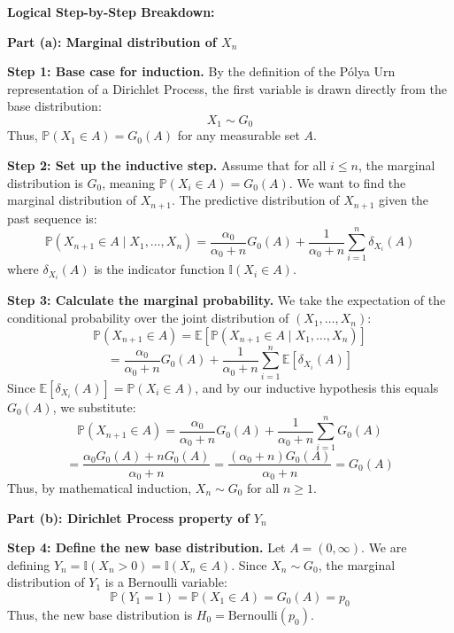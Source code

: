 \begin{solution}
\textbf{Logical Step-by-Step Breakdown:}

\textbf{Part (a): Marginal distribution of $X_n$}

\textbf{Step 1: Base case for induction.}
By the definition of the Pólya Urn representation of a Dirichlet Process, the first variable is drawn directly from the base distribution:
\[ X_1 \sim G_0 \]
Thus, $\mathbb{P}(X_1 \in A) = G_0(A)$ for any measurable set $A$.

\textbf{Step 2: Set up the inductive step.}
Assume that for all $i \leq n$, the marginal distribution is $G_0$, meaning $\mathbb{P}(X_i \in A) = G_0(A)$.
We want to find the marginal distribution of $X_{n+1}$. The predictive distribution of $X_{n+1}$ given the past sequence is:
\[ \mathbb{P}(X_{n+1} \in A \mid X_1, \dots, X_n) = \frac{\alpha_0}{\alpha_0 + n} G_0(A) + \frac{1}{\alpha_0 + n} \sum_{i=1}^n \delta_{X_i}(A) \]
where $\delta_{X_i}(A)$ is the indicator function $\mathbb{I}(X_i \in A)$.

\textbf{Step 3: Calculate the marginal probability.}
We take the expectation of the conditional probability over the joint distribution of $(X_1, \dots, X_n)$:
\[ \mathbb{P}(X_{n+1} \in A) = \mathbb{E} \left[ \mathbb{P}(X_{n+1} \in A \mid X_1, \dots, X_n) \right] \]
\[ = \frac{\alpha_0}{\alpha_0 + n} G_0(A) + \frac{1}{\alpha_0 + n} \sum_{i=1}^n \mathbb{E}[\delta_{X_i}(A)] \]
Since $\mathbb{E}[\delta_{X_i}(A)] = \mathbb{P}(X_i \in A)$, and by our inductive hypothesis this equals $G_0(A)$, we substitute:
\[ \mathbb{P}(X_{n+1} \in A) = \frac{\alpha_0}{\alpha_0 + n} G_0(A) + \frac{1}{\alpha_0 + n} \sum_{i=1}^n G_0(A) \]
\[ = \frac{\alpha_0 G_0(A) + n G_0(A)}{\alpha_0 + n} = \frac{(\alpha_0 + n) G_0(A)}{\alpha_0 + n} = G_0(A) \]
Thus, by mathematical induction, $X_n \sim G_0$ for all $n \geq 1$.

\textbf{Part (b): Dirichlet Process property of $Y_n$}

\textbf{Step 4: Define the new base distribution.}
Let $A = (0, \infty)$. We are defining $Y_n = \mathbb{I}(X_n > 0) = \mathbb{I}(X_n \in A)$.
Since $X_n \sim G_0$, the marginal distribution of $Y_1$ is a Bernoulli variable:
\[ \mathbb{P}(Y_1 = 1) = \mathbb{P}(X_1 \in A) = G_0(A) = p_0 \]
Thus, the new base distribution is $H_0 = \text{Bernoulli}(p_0)$.


\end{solution}
